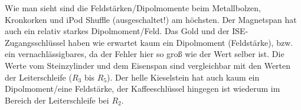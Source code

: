 Wie man sieht sind die Feldstärken/Dipolmomente beim Metallbolzen, Kronkorken und iPod Shuffle (ausgeschaltet!) am höchsten. Der Magnetspan hat auch ein relativ starkes Dipolmoment/Feld. Das Gold und der ISE-Zugangsschlüssel haben wie erwartet kaum ein Dipolmoment (Feldstärke), bzw. ein vernachlässigbares, da der Fehler hier so groß wie der Wert selber ist. Die Werte vom Steinzylinder und dem Eisenspan sind vergleichbar mit den Werten der Leiterschleife ($R_3$ bis $R_5$). Der helle Kieselstein hat auch kaum ein Dipolmoment/eine Feldstärke, der Kaffeeschlüssel hingegen ist wiederum im Bereich der Leiterschleife bei $R_2$.















